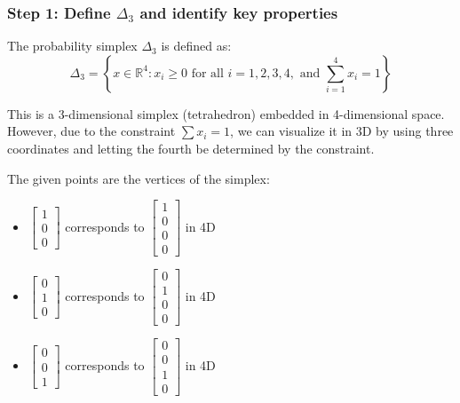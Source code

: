 \documentclass{article}
\begin{document}
\subsubsection*{Step 1: Define $\Delta_3$ and identify key properties}
\parbox{\textwidth}{
The probability simplex $\Delta_3$ is defined as:
$$\Delta_3 = \left\{x \in \mathbb{R}^4 : x_i \geq 0 \text{ for all } i = 1,2,3,4, \text{ and } \sum_{i=1}^{4} x_i = 1\right\}$$

This is a 3-dimensional simplex (tetrahedron) embedded in 4-dimensional space. However, due to the constraint $\sum x_i = 1$, we can visualize it in 3D by using three coordinates and letting the fourth be determined by the constraint.

The given points are the vertices of the simplex:
\begin{itemize}
\item $\begin{bmatrix} 1 \\ 0 \\ 0 \end{bmatrix}$ corresponds to $\begin{bmatrix} 1 \\ 0 \\ 0 \\ 0 \end{bmatrix}$ in 4D
\item $\begin{bmatrix} 0 \\ 1 \\ 0 \end{bmatrix}$ corresponds to $\begin{bmatrix} 0 \\ 1 \\ 0 \\ 0 \end{bmatrix}$ in 4D
\item $\begin{bmatrix} 0 \\ 0 \\ 1 \end{bmatrix}$ corresponds to $\begin{bmatrix} 0 \\ 0 \\ 1 \\ 0 \end{bmatrix}$ in 4D
\end{itemize}
}
\end{document}

